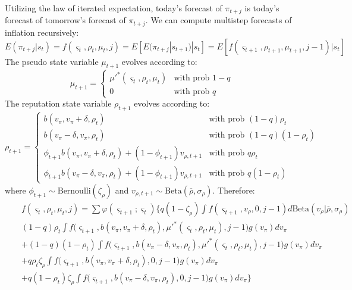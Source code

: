 \documentclass[12pt,letter,leqno]{article}
\theoremstyle{asn}
\theoremstyle{lem}
\theoremstyle{slem}
\theoremstyle{prop}
\theoremstyle{appprop}
\theoremstyle{rem}
\theoremstyle{defn}
\begin{document}
Utilizing the law of iterated expectation, today's forecast of $\pi_{t+j}$ is today's forecast of tomorrow's forecast of $\pi_{t+j}$. 
We can compute multistep forecasts of inflation recursively:
\begin{equation}\label{recursive computation}
E(\pi_{t+j}|s_t)=f(\varsigma _{t},\rho _{t},\mu_{t},j)=E[E(\pi_{t+j}|s_{t+1})|s_t]=E[f(\varsigma _{t+1},\rho _{t+1},\mu_{t+1},j-1)|s_t]
\end{equation}
The pseudo state variable $\mu_{t+1}$ evolves according to: 
\begin{equation*}
\mu_{t+1} = 
\begin{cases}
    \mu'^*(\varsigma_{t},\rho_{t},\mu_{t}) & \text{with prob $1-q$ }  \\
    0 & \text{with prob $q$ }
\end{cases}    
\end{equation*}
The reputation state variable $\rho_{t+1}$ evolves according to:
\begin{equation*}
\rho_{t+1}=
\begin{cases}
b(v_\pi,v_\pi+\delta,\rho_{t}) & \text{with prob $(1-q)\rho_t$ } \\
b(v_\pi-\delta,v_\pi,\rho_{t}) & \text{with prob $(1-q)(1-\rho_t)$ } \\
\phi_{t+1}b(v_\pi,v_\pi+\delta,\rho_{t})+(1-\phi_{t+1})v_{\rho,t+1} & \text{with prob $q\rho_t$ } \\
\phi_{t+1}b(v_\pi-\delta,v_\pi,\rho_{t})+(1-\phi_{t+1})v_{\rho,t+1} & \text{with prob $q(1-\rho_t)$ }
\end{cases}
\end{equation*}
where $\phi_{t+1} \sim \text{Bernoulli}(\zeta_\rho)$ and $v_{\rho,t+1} \sim \text{Beta}(\overline{\rho},\sigma_{\rho})$.
Therefore: 
\begin{eqnarray*}
&&f(\varsigma_{t},\rho_{t},\mu_t,j)=\sum \varphi (\varsigma_{t+1};\varsigma_{t})\Big\{  q(1-\zeta_\rho)\int f(\varsigma_{t+1},v_\rho,0,j-1)d\text{Beta}(v_\rho|\overline{\rho},\sigma_{\rho})
\\
&&(1-q)\rho_{t}\int f\big(\varsigma_{t+1},b(v_\pi,v_\pi+\delta,\rho
_{t}),\mu'^*(\varsigma_{t},\rho_{t},\mu_{t}),j-1\big)g(v_\pi)dv_\pi   \nonumber
\\
&&+(1-q)(1-\rho_{t})\int f\big(\varsigma_{t+1},b(v_\pi-\delta,v_\pi,\rho_{t}),\mu'^*(\varsigma_{t},\rho_{t},\mu_{t}),j-1\big)g(v_\pi)dv_\pi \nonumber \\
&&+q\rho_{t}\zeta_\rho\int  f\big(\varsigma_{t+1},b(v_\pi,v_\pi+\delta,\rho
_{t}),0,j-1\big)g(v_\pi)dv_\pi  \nonumber \\
&&+q(1-\rho_{t})\zeta_\rho \int  f\big(\varsigma_{t+1},b(v_\pi-\delta,v_\pi,\rho
_{t}),0,j-1\big)g(v_\pi)dv_\pi \Big\} 
\nonumber
\end{eqnarray*}
\end{document}
